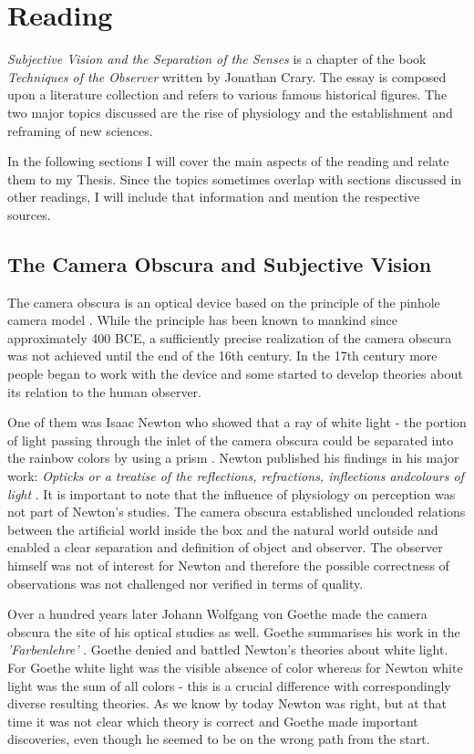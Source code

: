 \documentclass[12pt,a4paper]{article}
\begin{document}
\section*{Reading}

{\it{Subjective Vision and the Separation of the Senses}} is a chapter of the book {\it{Techniques of the
Observer}} \cite{crary} written by Jonathan Crary. The essay is composed upon a literature collection and
refers to various famous historical figures. The two major topics discussed are the rise of physiology and
the establishment and reframing of new sciences.

In the following sections I will cover the main aspects of the reading and relate them to my Thesis.
Since the topics sometimes overlap with sections discussed in other readings, I will include that
information and mention the respective sources.

\subsection*{The Camera Obscura and Subjective Vision}

The camera obscura is an optical device based on the principle of the pinhole camera model \cite{camera}. While
the principle has been known to mankind since approximately 400 BCE, a sufficiently precise realization of the
camera obscura was not achieved until the end of the 16th century. In the 17th century more people began to
work with the device and some started to develop theories about its relation to the human observer.

One of them was Isaac Newton who showed that a ray of white light - the portion of light passing through the
inlet of the camera obscura could be separated into the rainbow colors by using a prism \cite{newtongoethe}.
Newton published his findings in his major work: {\it{Opticks or a treatise of the reflections, refractions,
inflections andcolours of light}} \cite{opticks}.
It is important to note that the influence of physiology on perception
was not part of Newton's studies. The camera obscura established unclouded relations between
the artificial world inside the box and the natural world outside and enabled a clear separation
and definition of object and observer. The observer himself was not of interest for Newton and therefore the
possible correctness of observations was not challenged nor verified in terms of quality.

Over a hundred years later Johann Wolfgang von Goethe made the camera obscura the site of his optical studies
as well. Goethe summarises his work in the {\it{'Farbenlehre'}} \cite{farbenlehre}. 
Goethe denied and battled Newton's theories about white light. For Goethe white light was the visible
absence of color whereas for Newton white light was the sum of all colors - this is a crucial difference
with correspondingly diverse resulting theories. As we know by today Newton was right, but at that time it
was not clear which theory is correct and Goethe made important discoveries, even though he seemed to be on
the wrong path from the start.
\end{document}
